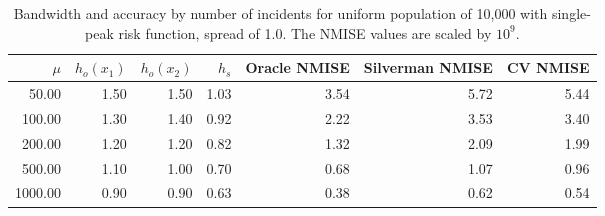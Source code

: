 \begin{table}[ht]
\centering
\begin{tabular}{rrrrrrr}
  \hline
$\mu$ & $h_{o}(x_1)$ & $h_{o}(x_2)$ & $h_{s}$ & Oracle NMISE & Silverman NMISE & CV NMISE \\ 
  \hline
50.00 & 1.50 & 1.50 & 1.03 & 3.54 & 5.72 & 5.44 \\ 
  100.00 & 1.30 & 1.40 & 0.92 & 2.22 & 3.53 & 3.40 \\ 
  200.00 & 1.20 & 1.20 & 0.82 & 1.32 & 2.09 & 1.99 \\ 
  500.00 & 1.10 & 1.00 & 0.70 & 0.68 & 1.07 & 0.96 \\ 
  1000.00 & 0.90 & 0.90 & 0.63 & 0.38 & 0.62 & 0.54 \\ 
   \hline
\end{tabular}
\caption[Bandwidth and accuracy by number of incidents]{Bandwidth and accuracy by number of incidents for uniform population of 10,000 with single-peak risk function, spread of 1.0. The NMISE values are scaled by $10^9$.} 
\label{tab:results:bandwidth_vs_mu}
\end{table}
